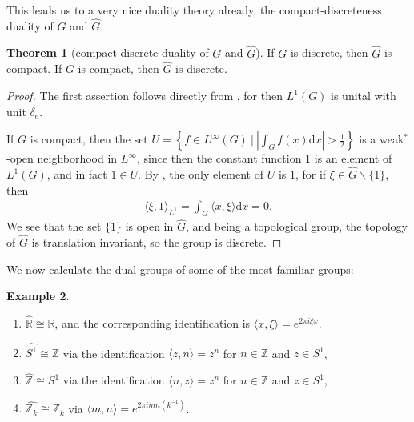 \documentclass[10pt,twoside,openany,final]{memoir}
\theoremstyle{definition}
\newtheorem{theorem}{Theorem}[chapter]
\theoremstyle{Break}
\newtheorem{example}[theorem]{Example}
\newcommand{\R}{\mathbb{R}}
\newcommand{\Z}{\mathbb{Z}}
\newcommand{\G}{\widehat{G}}
\renewcommand{\d}{\mathrm{d}}
\begin{document}
This leads us to a very nice duality theory already, the compact-discreteness duality of $G$ and $\widehat{G}$:
\begin{theorem}[compact-discrete duality of $G$ and $\widehat{G}$]
	If $G$ is discrete, then $\widehat{G}$ is compact. If $G$ is compact, then $\widehat{G}$ is discrete.	
	\label{4.4}
\end{theorem}
\begin{proof}
	The first assertion follows directly from , for then $L^1(G)$ is unital with unit $\delta_e$.

	If $G$ is compact, then the set $U=\left\{ f \in L^\infty(G) \ \big| \ \left| \int_G f(x) \d x \right| > \frac{1}{2} \right\}$ is a weak$^*$-open neighborhood in $L^\infty$, since then the constant function $1$ is an element of $L^1(G)$, and in fact $1 \in U$. By , the only element of $U$ is $1$, for if $\xi\in \widehat{G}\backslash\{1\}$, then 
	\begin{align*}
		\langle \xi , 1 \rangle_{L^1}=\int_G \langle x , \xi \rangle \d x = 0.
	\end{align*}
	We see that the set $\{1\}$ is open in $\widehat{G}$, and being a topological group, the topology of $\G$ is translation invariant, so the group is discrete.
\end{proof}
We now calculate the dual groups of some of the most familiar groups:
\begin{example}
	\mbox{}
	\begin{enumerate}
		\item $\widehat{\R} \cong \R$, and the corresponding identification is $\langle x,\xi\rangle=e^{2\pi i \xi x}$.
		\item $\widehat{S^1} \cong \Z$ via the identification $\langle z,n\rangle = z^n$ for $n \in \Z$ and $z \in S^1$,
		\item $\widehat{\Z} \cong S^1$ via the identification $\langle n,z\rangle = z^n$ for $n \in \Z$ and $z \in S^1$,
		\item $\widehat{\Z_k}\cong \Z_k$ via $\langle m,n \rangle= e^{2 \pi i m n (k^{-1})}$.
	\end{enumerate}
\end{example}
\end{document}
